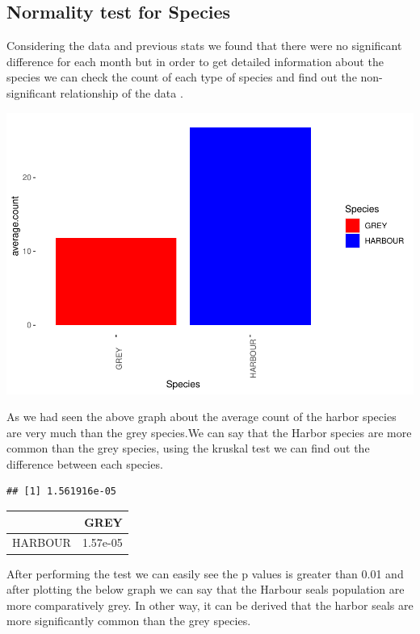 \documentclass[
]{article}
\begin{document}
\hypertarget{normality-test-for-species}{%
\subsection{Normality test for
Species}\label{normality-test-for-species}}

Considering the data and previous stats we found that there were no
significant difference for each month but in order to get detailed
information about the species we can check the count of each type of
species and find out the non-significant relationship of the data .

\includegraphics{Statistical-analysis-in-RStudio_files/figure-latex/unnamed-chunk-19-1.pdf}

As we had seen the above graph about the average count of the harbor
species are very much than the grey species.We can say that the Harbor
species are more common than the grey species, using the kruskal test we
can find out the difference between each species.

\begin{verbatim}
## [1] 1.561916e-05
\end{verbatim}

\begin{longtable}[]{@{}lr@{}}
\toprule
& GREY\tabularnewline
\midrule
\endhead
HARBOUR & 1.57e-05\tabularnewline
\bottomrule
\end{longtable}

After performing the test we can easily see the p values is greater than
0.01 and after plotting the below graph we can say that the Harbour
seals population are more comparatively grey. In other way, it can be
derived that the harbor seals are more significantly common than the
grey species.
\end{document}
